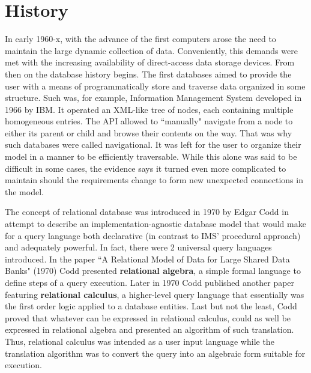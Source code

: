 \documentclass[12pt]{article}
\begin{document}
\maketitle

\tableofcontents
\newpage

\section{History}

In early 1960-x, with the advance of the first computers arose the need to
maintain the large dynamic collection of data. Conveniently, this demands
were met with the increasing availability of direct-access data storage devices.
From then on the database history begins. The first databases aimed to provide the
user with a means of programmatically store and traverse data organized in some
structure. Such was, for example, Information Management System developed in 1966 by IBM.
It operated an XML-like tree of nodes, each containing multiple homogeneous entries.
The API allowed to ``manually" navigate from a node to either its parent or
child and browse their contents on the way. That was why such databases were called navigational.
It was left for the user to organize their model in a manner to be efficiently traversable.
While this alone was said to be difficult in some cases, the evidence says it turned
even more complicated to maintain should the requirements
change to form new unexpected connections in the model.

The concept of relational database was introduced in 1970 by Edgar Codd in attempt to
describe an implementation-agnostic database model that would make for a query language
both declarative (in contrast to IMS' procedural approach) and adequately powerful.
In fact, there were 2 universal query languages introduced.
In the paper ``A Relational Model of Data for Large Shared Data Banks" (1970)
Codd presented \textbf{relational algebra}, a simple formal language to define steps of a query
execution. Later in 1970 Codd published another paper featuring \textbf{relational calculus},
a higher-level query language that essentially was the first order logic applied to
a database entities. Last but not the least, Codd proved that whatever can be expressed
in relational calculus, could as well be expressed in relational algebra and presented an
algorithm of such translation. Thus, relational calculus was intended as a user input
language while the translation algorithm was to convert the query into an algebraic form
suitable for execution. 
\end{document}
